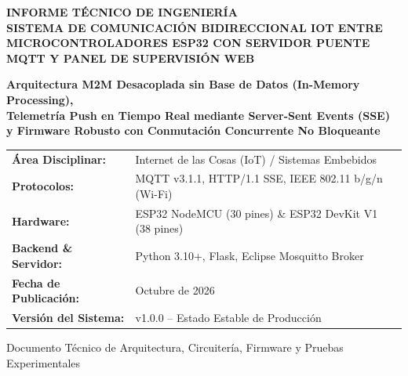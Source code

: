 \documentclass[11pt,a4paper]{article}
\begin{document}
\begin{titlepage}
    \centering
    \vspace*{1.0cm}
    
    {\Huge \bfseries \color{NavyBlue} INFORME TÉCNICO DE INGENIERÍA} \\[0.5cm]
    {\Large \bfseries \color{Teal} SISTEMA DE COMUNICACIÓN BIDIRECCIONAL IOT ENTRE MICROCONTROLADORES ESP32 CON SERVIDOR PUENTE MQTT Y PANEL DE SUPERVISIÓN WEB} \\[1.5cm]
    
    \begin{tcolorbox}[colback=LightGray, colframe=NavyBlue, width=0.92\textwidth, arc=2mm]
        \centering
        \vspace{0.2cm}
        \textbf{\large Arquitectura M2M Desacoplada sin Base de Datos (In-Memory Processing),} \\
        \textbf{\large Telemetría Push en Tiempo Real mediante Server-Sent Events (SSE)} \\
        \textbf{\large y Firmware Robusto con Conmutación Concurrente No Bloqueante}
        \vspace{0.2cm}
    \end{tcolorbox}
    
    \vspace{2.0cm}
    
    \begin{tabular}{ll}
        \textbf{Área Disciplinar:} & Internet de las Cosas (IoT) / Sistemas Embebidos \\
        \textbf{Protocolos:} & MQTT v3.1.1, HTTP/1.1 SSE, IEEE 802.11 b/g/n (Wi-Fi) \\
        \textbf{Hardware:} & ESP32 NodeMCU (30 pines) \& ESP32 DevKit V1 (38 pines) \\
        \textbf{Backend \& Servidor:} & Python 3.10+, Flask, Eclipse Mosquitto Broker \\
        \textbf{Fecha de Publicación:} & Octubre de 2026 \\
        \textbf{Versión del Sistema:} & v1.0.0 -- Estado Estable de Producción \\
    \end{tabular}
    
    \vfill
    
    
    \vspace{0.4cm}
    {\small \color{DarkSlate} Documento Técnico de Arquitectura, Circuitería, Firmware y Pruebas Experimentales}
\end{titlepage}
\end{document}
